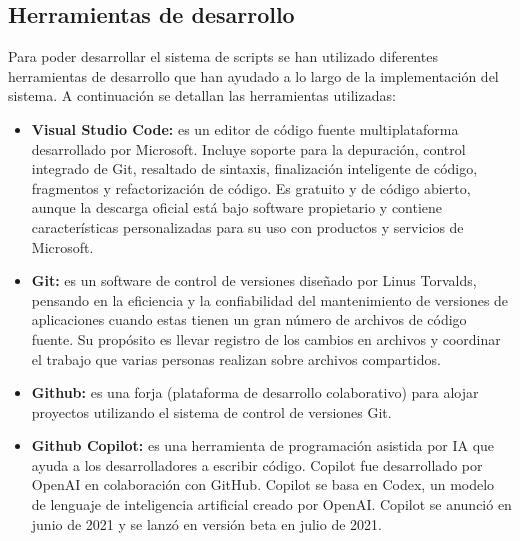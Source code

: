 \subsection{Herramientas de desarrollo}
\label{subsec:herramientas_desarrollo}


Para poder desarrollar el sistema de scripts se han utilizado diferentes herramientas de desarrollo que han 
ayudado a lo largo de la implementación del sistema. A continuación se detallan las herramientas utilizadas:

\begin{itemize}
    \item \textbf{Visual Studio Code:} es un editor de código fuente multiplataforma desarrollado por Microsoft.
        Incluye soporte para la depuración, control integrado de Git, resaltado de sintaxis, 
        finalización inteligente de código, fragmentos y refactorización de código. Es gratuito y de código abierto,
        aunque la descarga oficial está bajo software propietario y contiene características personalizadas 
        para su uso con productos y servicios de Microsoft. \cite{VisualStudioCode}
    \item \textbf{Git:} es un software de control de versiones diseñado por Linus Torvalds, pensando en la
        eficiencia y la confiabilidad del mantenimiento de versiones de aplicaciones cuando estas tienen un
        gran número de archivos de código fuente. Su propósito es llevar registro de los cambios en archivos
        y coordinar el trabajo que varias personas realizan sobre archivos compartidos. \cite{Git}
    \item \textbf{Github:} es una forja (plataforma de desarrollo colaborativo) para alojar proyectos utilizando
        el sistema de control de versiones Git. \cite{Github}
    \item \textbf{Github Copilot:} es una herramienta de programación asistida por IA que ayuda a los desarrolladores
        a escribir código. Copilot fue desarrollado por OpenAI en colaboración con GitHub. Copilot se basa en Codex,
        un modelo de lenguaje de inteligencia artificial creado por OpenAI. Copilot se anunció en junio de 2021 y
        se lanzó en versión beta en julio de 2021. \cite{GithubCopilot}
\end{itemize}

